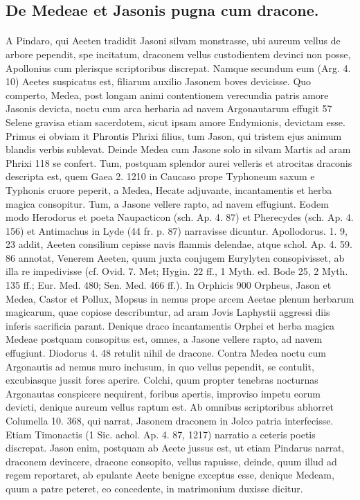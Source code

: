 \documentclass[landscape, a4paper, 11pt, oneside, polutonikogreek, german]{article}
\begin{document}
\subsection{De Medeae et Jasonis pugna cum dracone.}
\paragraph{}
A Pindaro, qui Aeeten tradidit Jasoni silvam monstrasse, ubi aureum vellus de arbore pependit, spe incitatum, draconem vellus custodientem devinci non posse, Apollonius cum plerisque scriptoribus discrepat. Namque secundum eum (Arg. 4. 10) Aeetes suspicatus est, filiarum auxilio Jasonem boves devicisse. Quo comperto, Medea, post longam animi contentionem verecundia patris amore Jasonis devicta, noctu cum arca herbaria ad navem Argonautarum effugit 57 Selene gravisa etiam sacerdotem, sicut ipsam amore Endymionis, devictam esse. Primus ei obviam it Phrontis Phrixi filius, tum Jason, qui tristem ejus animum blandis verbis sublevat. Deinde Medea cum Jasone solo in silvam Martis ad aram Phrixi 118 se confert. Tum, postquam splendor aurei velleris et atrocitas draconis descripta est, quem Gaea 2. 1210 in Caucaso prope Typhoneum saxum e Typhonis cruore peperit, a Medea, Hecate adjuvante, incantamentis et herba magica consopitur. Tum, a Jasone vellere rapto, ad navem effugiunt. Eodem modo Herodorus et poeta Naupacticon (sch. Ap. 4. 87) et Pherecydes (sch. Ap. 4. 156) et Antimachus in Lyde (44 fr. p. 87) narravisse dicuntur. Apollodorus. 1. 9, 23 addit, Aeeten consilium cepisse navis flammis delendae, atque schol. Ap. 4. 59. 86 annotat, Venerem Aeeten, quum juxta conjugem Eurylyten consopivisset, ab illa re impedivisse (cf. Ovid. 7. Met; Hygin. 22 ff., 1 Myth. ed. Bode 25, 2 Myth. 135 ff.; Eur. Med. 480; Sen. Med. 466 ff.). In Orphicis 900 Orpheus, Jason et Medea, Castor et Pollux, Mopsus in nemus prope arcem Aeetae plenum herbarum magicarum, quae copiose describuntur, ad aram Jovis Laphystii aggressi diis inferis sacrificia parant. Denique draco incantamentis Orphei et herba magica Medeae postquam consopitus est, omnes, a Jasone vellere rapto, ad navem effugiunt. Diodorus 4. 48 retulit nihil de dracone. Contra Medea noctu cum Argonautis ad nemus muro inclusum, in quo vellus pependit, se contulit, excubiasque jussit fores aperire. Colchi, quum propter tenebras nocturnas Argonautas conspicere nequirent, foribus apertis, improviso impetu eorum devicti, denique aureum vellus raptum est. Ab omnibus scriptoribus abhorret Columella 10. 368, qui narrat, Jasonem draconem in Jolco patria interfecisse. Etiam Timonactis (1 Sic. achol. Ap. 4. 87, 1217) narratio a ceteris poetis discrepat. Jason enim, postquam ab Aeete jussus est, ut etiam Pindarus narrat, draconem devincere, dracone consopito, vellus rapuisse, deinde, quum illud ad regem reportaret, ab epulante Aeete benigne exceptus esse, denique Medeam, quum a patre peteret, eo concedente, in matrimonium duxisse dicitur.
\end{document}
